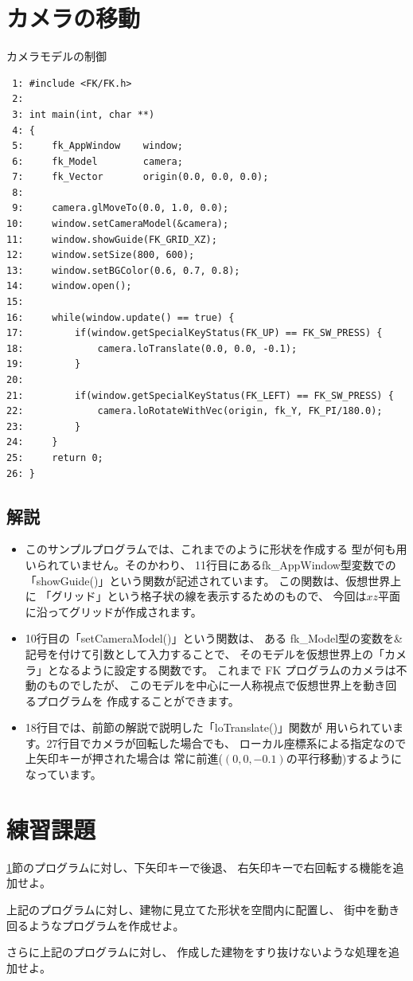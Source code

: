\section{カメラの移動} \label{sec:05-camera}
\begin{itembox}[l]{カメラモデルの制御}
\begin{verbatim}
 1: #include <FK/FK.h>
 2: 
 3: int main(int, char **)
 4: {
 5:     fk_AppWindow    window;
 6:     fk_Model        camera;
 7:     fk_Vector       origin(0.0, 0.0, 0.0);
 8: 
 9:     camera.glMoveTo(0.0, 1.0, 0.0);
10:     window.setCameraModel(&camera);
11:     window.showGuide(FK_GRID_XZ);
12:     window.setSize(800, 600);
13:     window.setBGColor(0.6, 0.7, 0.8);
14:     window.open();
15: 
16:     while(window.update() == true) {
17:         if(window.getSpecialKeyStatus(FK_UP) == FK_SW_PRESS) {
18:             camera.loTranslate(0.0, 0.0, -0.1);
19:         }
20: 
21:         if(window.getSpecialKeyStatus(FK_LEFT) == FK_SW_PRESS) {
22:             camera.loRotateWithVec(origin, fk_Y, FK_PI/180.0);
23:         }
24:     }
25:     return 0;
26: }
\end{verbatim}
\end{itembox}
\subsection*{解説}
\begin{itemize}
 \item このサンプルプログラムでは、これまでのように形状を作成する
	型が何も用いられていません。そのかわり、
	11行目にあるfk\_AppWindow型変数での\\
	「showGuide()」という関数が記述されています。
	この関数は、仮想世界上に
	「グリッド」という格子状の線を表示するためのもので、
	今回は\(xz\)平面に沿ってグリッドが作成されます。

 \item 10行目の「setCameraModel()」という関数は、
	ある fk\_Model型の変数を\&記号を付けて引数として入力することで、
	そのモデルを仮想世界上の「カメラ」となるように設定する関数です。
	これまで FK プログラムのカメラは不動のものでしたが、
	このモデルを中心に一人称視点で仮想世界上を動き回るプログラムを
	作成することができます。

 \item 18行目では、前節の解説で説明した「loTranslate()」関数が
	用いられています。27行目でカメラが回転した場合でも、
	ローカル座標系による指定なので上矢印キーが押された場合は
	常に前進(\((0, 0, -0.1)\)の平行移動)するようになっています。

\end{itemize}

\section{練習課題} \label{sec:06-q}
\begin{description}
 \myitem \ref{sec:05-camera}節のプログラムに対し、下矢印キーで後退、
	右矢印キーで右回転する機能を追加せよ。

 \myitem 上記のプログラムに対し、建物に見立てた形状を空間内に配置し、
	街中を動き回るようなプログラムを作成せよ。

 \myitem さらに上記のプログラムに対し、
	作成した建物をすり抜けないような処理を追加せよ。
\end{description}
